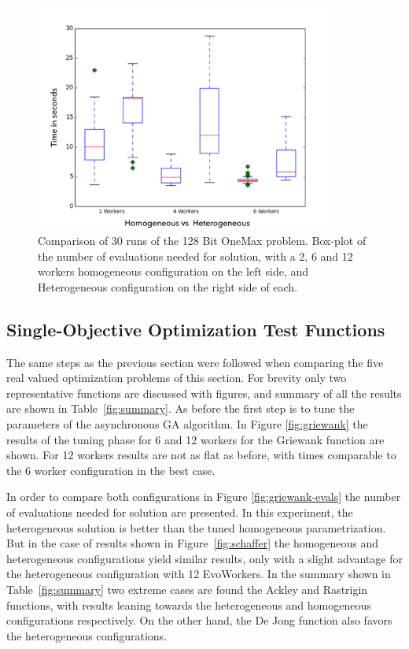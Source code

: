 \documentclass{llncs}
\begin{document}
\begin{figure}[t]
    \centering
        \includegraphics[width=10cm]{img/one_max_comp.png}
    \caption{Comparison of 30 runs of the 128 Bit OneMax problem. 
    Box-plot of the number of evaluations needed for solution, with a 2, 6 and 12 workers
    homogeneous configuration on the left side, and Heterogeneous configuration on the
    right side of each.
    }
    \label{fig:comp-onemax}
\end{figure}



\subsection{ Single-Objective Optimization Test Functions}

The same steps as the previous section were followed when comparing the five real valued 
optimization problems of this section. For brevity only two representative functions are discussed
with figures, and summary of all the results are shown in Table~\ref{fig:summary}. As before
the first step is to tune the parameters of the 
asynchronous GA algorithm. In Figure \ref{fig:griewank} the results of the tuning 
phase for 6 and 12 workers for the Griewank function are shown. For 12 workers
results are not as flat as before, with times comparable to the 6 worker 
configuration in the best case.

In order to compare both configurations in Figure \ref{fig:griewank-evals} the number of evaluations 
needed for solution are presented. In this experiment, the heterogeneous solution is better than the
tuned homogeneous parametrization. But in the case of results shown in Figure~\ref{fig:schaffer} 
the homogeneous and heterogeneous configurations yield similar results, 
only with a slight advantage
for the heterogeneous configuration with 12 EvoWorkers. In the summary shown in
Table~\ref{fig:summary} two extreme cases are found the Ackley and Rastrigin functions, 
with results leaning
towards the heterogeneous and homogeneous configurations respectively. On the other hand, the De Jong
function also favors the heterogeneous configurations. 
\end{document}
